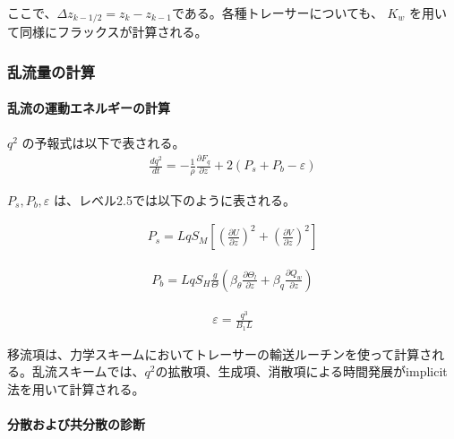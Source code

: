 ここで、\(\Delta z_{k-1/2}=z_k-z_{k-1}\)である。各種トレーサーについても、
\(K_w\) を用いて同様にフラックスが計算される。

\hypertarget{ux4e71ux6d41ux91cfux306eux8a08ux7b97}{%
\subsubsection{乱流量の計算}\label{ux4e71ux6d41ux91cfux306eux8a08ux7b97}}

\hypertarget{ux4e71ux6d41ux306eux904bux52d5ux30a8ux30cdux30ebux30aeux30fcux306eux8a08ux7b97}{%
\paragraph{乱流の運動エネルギーの計算}\label{ux4e71ux6d41ux306eux904bux52d5ux30a8ux30cdux30ebux30aeux30fcux306eux8a08ux7b97}}

\(q^2\) の予報式は以下で表される。
\begin{eqnarray} \frac{d q^2}{dt}=-\frac{1}{\rho}\frac{\partial F_q}{\partial z}+2\left(P_s+P_b-\varepsilon\right) \end{eqnarray}

\(P_s,P_b,\varepsilon\) は、レベル2.5では以下のように表される。

\begin{eqnarray}P_s=Lq S_M \left[\left(\frac{\partial U}{\partial z}\right)^2+\left(\frac{\partial V}{\partial z}\right)^2\right]\end{eqnarray}

\begin{eqnarray}P_b=Lq S_H \frac{g}{\Theta}\left(\beta_\theta \frac{\partial \Theta_l}{\partial z}+\beta_q \frac{\partial Q_w}{\partial z}\right)\end{eqnarray}

\begin{eqnarray}\varepsilon=\frac{q^3}{B_1L}\end{eqnarray}

移流項は、力学スキームにおいてトレーサーの輸送ルーチンを使って計算される。乱流スキームでは、\(q^2\)の拡散項、生成項、消散項による時間発展がimplicit法を用いて計算される。

\hypertarget{ux5206ux6563ux304aux3088ux3073ux5171ux5206ux6563ux306eux8a3aux65ad}{%
\paragraph{分散および共分散の診断}\label{ux5206ux6563ux304aux3088ux3073ux5171ux5206ux6563ux306eux8a3aux65ad}}

